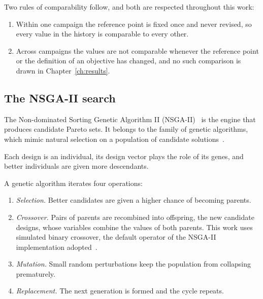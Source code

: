 Two rules of comparability follow, and both are respected throughout
this work:

\begin{enumerate}
  \item Within one campaign the reference point is fixed once and never
        revised, so every value in the history is comparable to every
        other.

  \item Across campaigns the values are not comparable whenever the
        reference point or the definition of an objective has changed,
        and no such comparison is drawn in Chapter~\ref{ch:results}.
\end{enumerate}

\subsection{The NSGA-II search}
\label{sec:bg-nsga2}

The Non-dominated Sorting Genetic Algorithm II
(NSGA-II)~\cite{deb_nsga2_2002} is the engine that produces candidate
Pareto sets. It belongs to the family of genetic algorithms, which
mimic natural selection on a population of candidate
solutions~\cite{deb_2001}.

Each design is an individual, its design vector plays the role of its
genes, and better individuals are given more descendants.

A genetic algorithm iterates four operations:

\begin{enumerate}
  \item \emph{Selection.} Better candidates are given a higher chance
        of becoming parents.

  \item \emph{Crossover.} Pairs of parents are recombined into
        offspring, the new candidate designs, whose variables combine the
        values of both parents. This work uses simulated binary
        crossover, the default operator of the NSGA-II implementation
        adopted~\cite{deb_2001,blank_deb_2020}.

  \item \emph{Mutation.} Small random perturbations keep the population
        from collapsing prematurely.

  \item \emph{Replacement.} The next generation is formed and the cycle
        repeats.
\end{enumerate}

